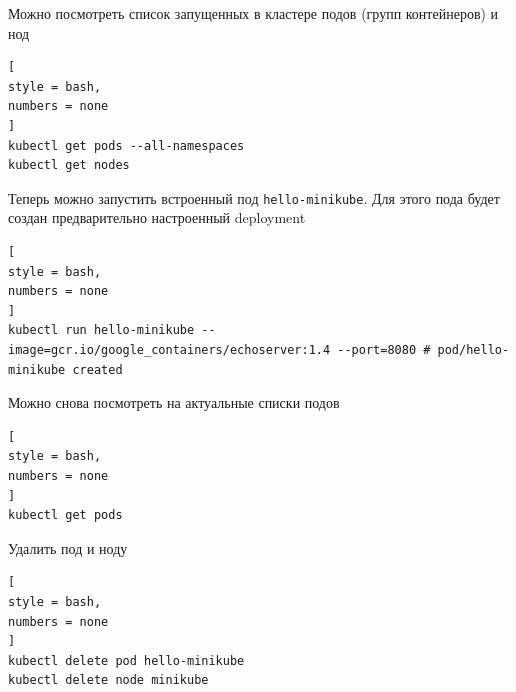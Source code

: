\documentclass[%
	11pt,
	a4paper,
	utf8,
		]{article}
\begin{document}
Можно посмотреть список запущенных в кластере подов (групп контейнеров) и нод
\begin{lstlisting}[
style = bash,
numbers = none	
]
kubectl get pods --all-namespaces
kubectl get nodes
\end{lstlisting}

Теперь можно запустить встроенный под \texttt{hello-minikube}. Для этого пода будет создан предварительно настроенный deployment
\begin{lstlisting}[
style = bash,
numbers = none	
]
kubectl run hello-minikube --image=gcr.io/google_containers/echoserver:1.4 --port=8080 # pod/hello-minikube created
\end{lstlisting}

Можно снова посмотреть на актуальные списки подов
\begin{lstlisting}[
style = bash,
numbers = none	
]
kubectl get pods
\end{lstlisting}

Удалить под и ноду
\begin{lstlisting}[
style = bash,
numbers = none	
]
kubectl delete pod hello-minikube
kubectl delete node minikube
\end{lstlisting}



\begin{thebibliography}{99}
\end{thebibliography}


\lstlistoflistings{}
\end{document}
